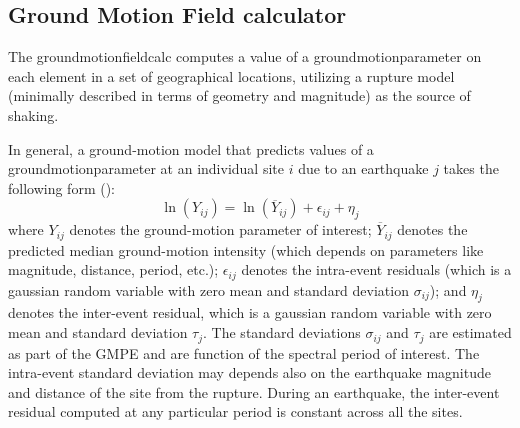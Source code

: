 \subsection{Ground Motion Field calculator}
%
The \gls{groundmotionfieldcalc} computes a value of a 
\gls{groundmotionparameter} on each element in a set of 
geographical locations, utilizing a rupture model (minimally 
described in terms of geometry and magnitude) as the source of 
shaking.

In general, a ground-motion model that predicts values of a 
\gls{groundmotionparameter} at an individual site $i$ due to 
an earthquake $j$ takes the following form (\cite{jayaram2009}):
%
\begin{equation}
\ln (Y_{ij}) = \ln (\overline{Y}_{ij})+\epsilon_{ij}+\eta_{j}
\label{gmfeq}
\end{equation}
%
%
where $Y_{ij}$ denotes the ground-motion parameter of interest; 
$\overline{Y}_{ij}$ denotes the predicted median ground-motion 
intensity (which depends on parameters like magnitude, distance, 
period, etc.); $\epsilon_{ij}$ denotes the intra-event residuals 
(which is a gaussian random variable with zero mean and standard 
deviation $\sigma_{ij}$); and $\eta_{j}$ denotes the inter-event 
residual, which is a gaussian random variable with zero mean and 
standard deviation $\tau_{j}$. The standard deviations $\sigma_{ij}$ 
and $\tau_{j}$ are estimated as part of the GMPE and are function of 
the spectral period of interest. The intra-event standard deviation 
may depends also on the earthquake magnitude and distance of the 
site from the rupture. During an earthquake, the inter-event residual
computed at any particular period is constant across all the sites.

